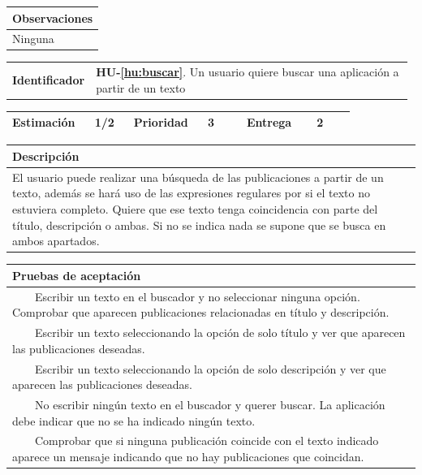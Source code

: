 \documentclass[11pt]{article}
\newcommand{\tabitem}{~~\llap{\textbullet}~~}
\begin{document}
\vspace{-0.8cm}
\begin{longtable}{p{1.028\linewidth}}
  \textbf{Observaciones}\\
  \midrule
  Ninguna\\
  \bottomrule
\end{longtable}

\begin{longtable}{p{0.18\linewidth}|p{0.8\linewidth}}
  \rowcolor{LightCyan}
  \textbf{Identificador} & \textbf{{HU-\ref{hu:buscar}}}. Un usuario quiere buscar una aplicación a partir de un texto \\  
\end{longtable}
\vspace{-0.8cm}
\begin{longtable}{p{0.18\linewidth}|p{0.1\linewidth}|p{0.18\linewidth}|p{0.1\linewidth}|p{0.18\linewidth}|p{0.1\linewidth}}
	\toprule
	\textbf{Estimación} & 1/2 & \textbf{Prioridad} & 3 & \textbf{Entrega} & 2 \\
	\bottomrule
\end{longtable}
\vspace{-0.8cm}
\begin{longtable}{p{1.028\linewidth}}
	\textbf{Descripción}\\
	\midrule
	El usuario puede realizar una búsqueda de las publicaciones a partir de un texto, además se hará uso de las expresiones regulares por si el texto no estuviera completo. Quiere que ese texto tenga coincidencia con parte del título, descripción o ambas. Si no se indica nada se supone que se busca en ambos apartados.\\
	\bottomrule
\end{longtable}
\vspace{-0.8cm}
\begin{longtable}{p{1.028\linewidth}}
	\textbf{Pruebas de aceptación}\\
	\midrule
	\tabitem Escribir un texto en el buscador y no seleccionar ninguna opción. Comprobar que aparecen publicaciones relacionadas en título y descripción.\\
	\tabitem Escribir un texto seleccionando la opción de solo título y ver que aparecen las publicaciones deseadas.\\
	\tabitem Escribir un texto seleccionando la opción de solo descripción y ver que aparecen las publicaciones deseadas.\\
	\tabitem No escribir ningún texto en el buscador y querer buscar. La aplicación debe indicar que no se ha indicado ningún texto.\\
	\tabitem Comprobar que si ninguna publicación coincide con el texto indicado aparece un mensaje indicando que no hay publicaciones que coincidan.\\
\end{longtable}
\end{document}
